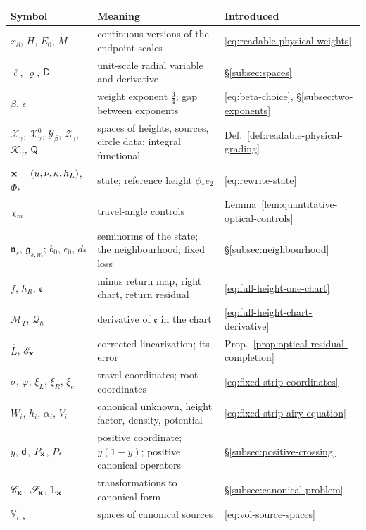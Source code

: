 \begin{longtable}{@{}p{.23\linewidth}p{.52\linewidth}p{.19\linewidth}@{}}
\toprule
Symbol & Meaning & Introduced\\
\midrule
\endhead
$x_\partial$, $H$, $E_0$, $M$ & continuous versions of the endpoint
 scales & \eqref{eq:readable-physical-weights}\\
$\ell$, $\varrho$, $\mathsf D$ & unit-scale radial variable and derivative
 & \S\ref{subsec:spaces}\\
$\beta$, $\epsilon$ & weight exponent $\tfrac34$; gap between
 exponents & \eqref{eq:beta-choice}, \S\ref{subsec:two-exponents}\\
$\mathcal X_\gamma$, $\mathcal X_\gamma^0$, $\mathcal Y_\beta$,
$\mathcal Z_\gamma$, $\mathcal K_\gamma$, $\mathsf Q$ & spaces of heights,
 sources, circle data; integral functional
 & Def.~\ref{def:readable-physical-grading}\\
$\mathbf x=(u,\nu,\kappa,h_L)$, $\Phi_*$ & state; reference height
 $\phi_*e_2$ & \eqref{eq:rewrite-state}\\
$\chi_m$ & travel-angle controls
 & Lemma~\ref{lem:quantitative-optical-controls}\\
$\mathfrak n_s$, $\mathfrak g_{s,m}$; $b_0$, $\epsilon_0$, $d_*$ &
 seminorms of the state; the neighbourhood; fixed loss
 & \S\ref{subsec:neighbourhood}\\
$f$, $h_R$, $\mathfrak e$ & minus return map, right chart, return
 residual & \eqref{eq:full-height-one-chart}\\
$\mathcal M_T$, $\mathcal Q_h$ & derivative of $\mathfrak e$ in the
 chart & \eqref{eq:full-height-chart-derivative}\\
$\widehat L$, $\mathscr E_{\mathbf x}$ & corrected linearization; its error
 & Prop.~\ref{prop:optical-residual-completion}\\
$\sigma$, $\varphi$; $\xi_L$, $\xi_R$, $\xi_c$ & travel coordinates;
 root coordinates & \eqref{eq:fixed-strip-coordinates}\\
$W_i$, $h_i$, $\alpha_i$, $V_i$ & canonical unknown, height factor,
 density, potential & \eqref{eq:fixed-strip-airy-equation}\\
$y$, $\mathsf d$, $P_{\mathbf x}$, $P_*$ & positive coordinate; $y(1-y)$;
 positive canonical operators & \S\ref{subsec:positive-crossing}\\
$\mathscr C_{\mathbf x}$, $\mathscr S_{\mathbf x}$, $\mathbb L_{\mathbf x}$ &
 transformations to canonical form & \S\ref{subsec:canonical-problem}\\
$\mathbb V_{t,s}$ & spaces of canonical sources
 & \eqref{eq:vol-source-spaces}\\

\end{longtable}
